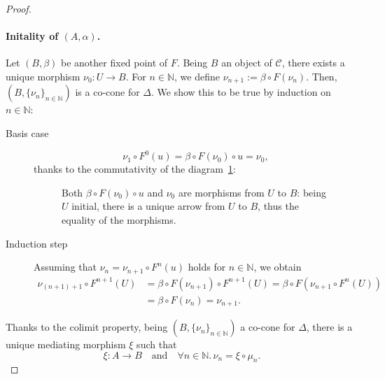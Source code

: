 \begin{proof}
  \paragraph{Initality of \((A,\alpha)\).} Let \((B,\beta)\) be another fixed point of \(F\).
  Being \(B\) an object of \(\mathcal{C}\), there exists a unique morphism \(\nu_0 \colon U \to B\).
  For \(n \in \mathbb{N}\), we define \(\nu_{n+1} := \beta \circ F(\nu_n)\).
  Then, \((B,\lbrace \nu_n \rbrace_{n \in \mathbb{N}})\) is a co-cone for \(\Delta\). We show this to be true by induction on \(n \in \mathbb{N}\):
  \begin{description}
    \item[Basis case]
    \begin{equation}
      \nu_1 \circ F^0(u) = \beta \circ F(\nu_0) \circ u = \nu_0,
    \end{equation}
    thanks to the commutativity of the diagram~\ref{02:diagram-2}:
    \begin{figure}[!ht]
      \begin{center}
      \end{center}
      \caption{Both \(\beta \circ F(\nu_0) \circ u\) and \(\nu_0\) are morphisms from \(U\) to \(B\): being \(U\) initial, there is a unique arrow from \(U\) to \(B\), thus the equality of the morphisms.}
      \label{02:diagram-2}
    \end{figure}
    \item[Induction step] Assuming that \(\nu_n = \nu_{n+1} \circ F^n(u)\) holds for \(n \in \mathbb{N}\), we obtain
    \begin{equation*}
      \begin{split}
        \nu_{(n+1)+1} \circ F^{n+1}(U) &=
        \beta \circ F(\nu_{n+1}) \circ F^{n+1}(U)
        = \beta \circ F(\nu_{n+1} \circ F^n(U)) \\
        &= \beta \circ F(\nu_n) = \nu_{n+1}.
      \end{split}
    \end{equation*}
  \end{description}
  Thanks to the colimit property, being \((B,\lbrace \nu_n \rbrace_{n \in \mathbb{N}})\) a co-cone for \(\Delta\), there is a unique mediating morphism \(\xi\) such that
  \begin{equation*}
    \xi \colon A \to B \quad\text{and}\quad \forall n \in \mathbb{N}.\, \nu_n = \xi \circ \mu_n.
  \end{equation*}
  

\end{proof}
